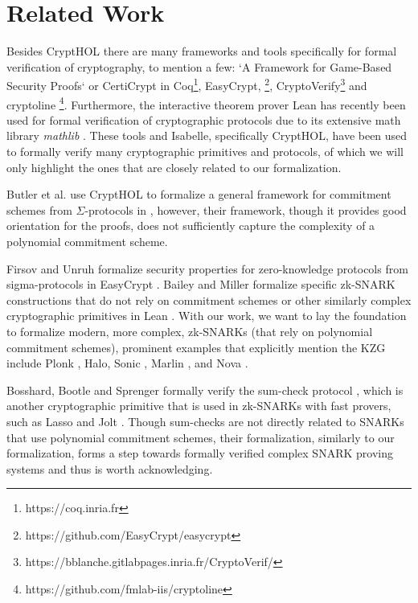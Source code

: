 \section{Related Work}
Besides CryptHOL there are many frameworks and tools specifically for formal verification of cryptography, to mention a few: `A Framework for Game-Based Security Proofs` \parencite{game_based_coq} or CertiCrypt \parencite{crypto_coq} in Coq\footnote{https://coq.inria.fr}, EasyCrypt, \footnote{https://github.com/EasyCrypt/easycrypt}, CryptoVerify\footnote{https://bblanche.gitlabpages.inria.fr/CryptoVerif/} and cryptoline \footnote{https://github.com/fmlab-iis/cryptoline}. Furthermore, the interactive theorem prover Lean \parencite{Lean} has recently been used for formal verification of cryptographic protocols due to its extensive math library \textit{mathlib} \parencite{Lean_groth16}.
These tools and Isabelle, specifically CryptHOL, have been used to formally verify many cryptographic primitives and protocols, of which we will only highlight the ones that are closely related to our formalization.

Butler et al. use CryptHOL to formalize a general framework for commitment schemes from $\Sigma$-protocols in \parencite{sigma_commit_crypto}, however, their framework, though it provides good orientation for the proofs, does not sufficiently capture the complexity of a polynomial commitment scheme.

Firsov and Unruh formalize security properties for zero-knowledge protocols from sigma-protocols in EasyCrypt \parencite{zk_easycrypt}.
Bailey and Miller formalize specific zk-SNARK constructions that do not rely on commitment schemes or other similarly complex cryptographic primitives in Lean \parencite{Lean_groth16}. With our work, we want to lay the foundation to formalize modern, more complex, zk-SNARKs (that rely on polynomial commitment schemes), prominent examples that explicitly mention the KZG include Plonk \parencite{plonk}, Halo\parencite{halo}, Sonic \parencite{sonic}, Marlin \parencite{marlin}, and Nova \parencite{nova}.

Bosshard, Bootle and Sprenger formally verify the sum-check protocol \parencite{sumcheck_Isabelle}, which is another cryptographic primitive that is used in zk-SNARKs with fast provers, such as Lasso and Jolt \parencite{Lasso, jolt}. Though sum-checks are not directly related to SNARKs that use polynomial commitment schemes, their formalization, similarly to our formalization, forms a step towards formally verified complex SNARK proving systems and thus is worth acknowledging.